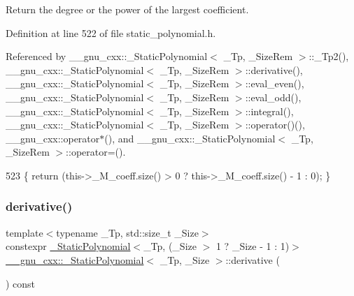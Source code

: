 Return the degree or the power of the largest coefficient. 

Definition at line 522 of file static\+\_\+polynomial.\+h.



Referenced by \+\_\+\+\_\+gnu\+\_\+cxx\+::\+\_\+\+Static\+Polynomial$<$ \+\_\+\+Tp, \+\_\+\+Size\+Rem $>$\+::\+\_\+\+Tp2(), \+\_\+\+\_\+gnu\+\_\+cxx\+::\+\_\+\+Static\+Polynomial$<$ \+\_\+\+Tp, \+\_\+\+Size\+Rem $>$\+::derivative(), \+\_\+\+\_\+gnu\+\_\+cxx\+::\+\_\+\+Static\+Polynomial$<$ \+\_\+\+Tp, \+\_\+\+Size\+Rem $>$\+::eval\+\_\+even(), \+\_\+\+\_\+gnu\+\_\+cxx\+::\+\_\+\+Static\+Polynomial$<$ \+\_\+\+Tp, \+\_\+\+Size\+Rem $>$\+::eval\+\_\+odd(), \+\_\+\+\_\+gnu\+\_\+cxx\+::\+\_\+\+Static\+Polynomial$<$ \+\_\+\+Tp, \+\_\+\+Size\+Rem $>$\+::integral(), \+\_\+\+\_\+gnu\+\_\+cxx\+::\+\_\+\+Static\+Polynomial$<$ \+\_\+\+Tp, \+\_\+\+Size\+Rem $>$\+::operator()(), \+\_\+\+\_\+gnu\+\_\+cxx\+::operator$\ast$(), and \+\_\+\+\_\+gnu\+\_\+cxx\+::\+\_\+\+Static\+Polynomial$<$ \+\_\+\+Tp, \+\_\+\+Size\+Rem $>$\+::operator=().


\begin{DoxyCode}
523       \{ \textcolor{keywordflow}{return} (this->\_M\_coeff.size() > 0 ? this->\_M\_coeff.size() - 1 : 0); \}
\end{DoxyCode}
\mbox{\label{class____gnu__cxx_1_1__StaticPolynomial_a1180d204a1aa8603293ec5b9c6f514b3}} 
\subsubsection{\texorpdfstring{derivative()}{derivative()}}
{\footnotesize\ttfamily template$<$typename \+\_\+\+Tp, std\+::size\+\_\+t \+\_\+\+Size$>$ \\
constexpr \hyperlink{class____gnu__cxx_1_1__StaticPolynomial}{\+\_\+\+Static\+Polynomial}$<$\+\_\+\+Tp, (\+\_\+\+Size $>$ 1 ? \+\_\+\+Size -\/ 1 \+: 1)$>$ \hyperlink{class____gnu__cxx_1_1__StaticPolynomial}{\+\_\+\+\_\+gnu\+\_\+cxx\+::\+\_\+\+Static\+Polynomial}$<$ \+\_\+\+Tp, \+\_\+\+Size $>$\+::derivative (\begin{DoxyParamCaption}{ }\end{DoxyParamCaption}) const\hspace{0.3cm}{\ttfamily [inline]}}

